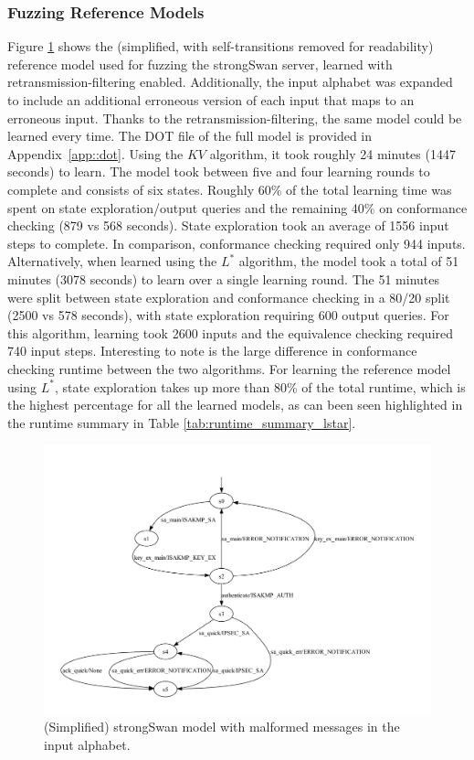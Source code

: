 \subsubsection*{Fuzzing Reference Models}
Figure \ref{fig:withfilterwitherrors} shows the (simplified, with self-transitions removed for readability) reference model used for fuzzing the strongSwan server, learned with retransmission-filtering enabled. Additionally, the input alphabet was expanded to include an additional erroneous version of each input that maps to an erroneous input. Thanks to the retransmission-filtering, the same model could be learned every time. The DOT file of the full model is provided in Appendix~\ref{app::dot}. Using the $KV$ algorithm, it took roughly 24 minutes (1447 seconds) to learn. The model took between five and four learning rounds to complete and consists of six states. Roughly 60\% of the total learning time was spent on state exploration/output queries and the remaining 40\% on conformance checking (879 vs 568 seconds). State exploration took an average of 1556 input steps to complete. In comparison, conformance checking required only 944 inputs. Alternatively, when learned using the $L^*$ algorithm, the model took a total of 51 minutes (3078 seconds) to learn over a single learning round. The 51 minutes were split between state exploration and conformance checking in a 80/20 split (2500 vs 578 seconds), with state exploration requiring 600 output queries. For this algorithm, learning took 2600 inputs and the equivalence checking required 740 input steps. Interesting to note is the large difference in conformance checking runtime between the two algorithms. For learning the reference model using $L^*$, state exploration takes up more than 80\% of the total runtime, which is the highest percentage for all the learned models, as can been seen highlighted in the runtime summary in Table \ref{tab:runtime_summary_lstar}.\\

\begin{figure}[H]
	\centering
	\includegraphics[width=\linewidth]{images/models/strongSwanErrKV}
	\caption{(Simplified) strongSwan model with malformed messages in the input alphabet.}
	\label{fig:withfilterwitherrors}
\end{figure}
\newpage

